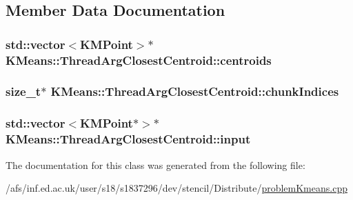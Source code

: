 \subsection{Member Data Documentation}
\hypertarget{classKMeans_1_1ThreadArgClosestCentroid_a3430e65d878b25d8b96a7e663be62e82}{
\subsubsection[{centroids}]{\setlength{\rightskip}{0pt plus 5cm}std\-::vector$<${\bf K\-M\-Point}$>$$\ast$ K\-Means\-::\-Thread\-Arg\-Closest\-Centroid\-::centroids}}\label{classKMeans_1_1ThreadArgClosestCentroid_a3430e65d878b25d8b96a7e663be62e82}
\hypertarget{classKMeans_1_1ThreadArgClosestCentroid_a84cc9890531db34f34e5c008c55a6d0a}{
\subsubsection[{chunk\-Indices}]{\setlength{\rightskip}{0pt plus 5cm}size\-\_\-t$\ast$ K\-Means\-::\-Thread\-Arg\-Closest\-Centroid\-::chunk\-Indices}}\label{classKMeans_1_1ThreadArgClosestCentroid_a84cc9890531db34f34e5c008c55a6d0a}
\hypertarget{classKMeans_1_1ThreadArgClosestCentroid_ab5aa69fc9a81c813c6a4836679e698f8}{
\subsubsection[{input}]{\setlength{\rightskip}{0pt plus 5cm}std\-::vector$<${\bf K\-M\-Point}$\ast$$>$$\ast$ K\-Means\-::\-Thread\-Arg\-Closest\-Centroid\-::input}}\label{classKMeans_1_1ThreadArgClosestCentroid_ab5aa69fc9a81c813c6a4836679e698f8}


The documentation for this class was generated from the following file\-:\begin{DoxyCompactItemize}
\item 
/afs/inf.\-ed.\-ac.\-uk/user/s18/s1837296/dev/stencil/\-Distribute/\hyperlink{problemKmeans_8cpp}{problem\-Kmeans.\-cpp}\end{DoxyCompactItemize}
